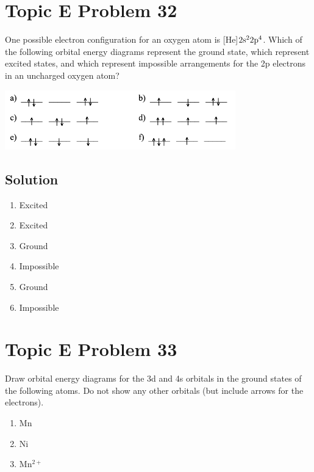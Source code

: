 \documentclass[10pt]{article}
\begin{document}
    \pagebreak
    \section{Topic E Problem 32}
        One possible electron configuration for an oxygen atom is [He]$\rm 2s^2 2p^4$. 
        Which of the following orbital energy diagrams represent the ground state, which represent excited states, and which represent impossible arrangements for the 2p electrons in an uncharged oxygen atom?
        \begin{center}
            \includegraphics[width=0.75\textwidth]{img-E32.png}
        \end{center}    
        
        \subsection{Solution}
            \begin{multicols}{2}
                \begin{enumerate}[label=\alph*/]
                    \item   Excited
                    \item   Excited
                    \item   Ground
                    \item   Impossible
                    \item   Ground
                    \item   Impossible
                \end{enumerate}
            \end{multicols}


    \pagebreak
    \section{Topic E Problem 33}
        Draw orbital energy diagrams for the 3d and 4s orbitals in the ground states of the following atoms. 
        Do not show any other orbitals (but include arrows for the electrons).
        \begin{multicols}{3}
            \begin{enumerate}[label=\alph*)]
                \item   Mn
                \item   Ni
                \item   Mn$^{2+}$
            \end{enumerate}
        \end{multicols}
\end{document}
